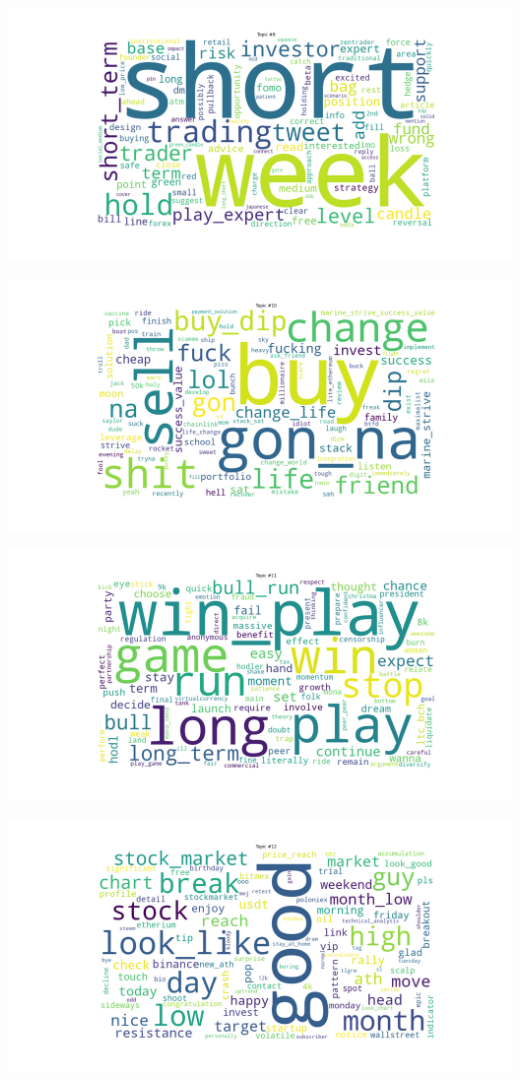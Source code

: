 \documentclass[
]{article}
\begin{document}
\pagebreak

\includegraphics{images/03 - Topic_9.png}

\pagebreak

\includegraphics{images/03 - Topic_10.png}

\pagebreak

\includegraphics{images/03 - Topic_11.png}

\pagebreak

\includegraphics{images/03 - Topic_12.png}
\end{document}
